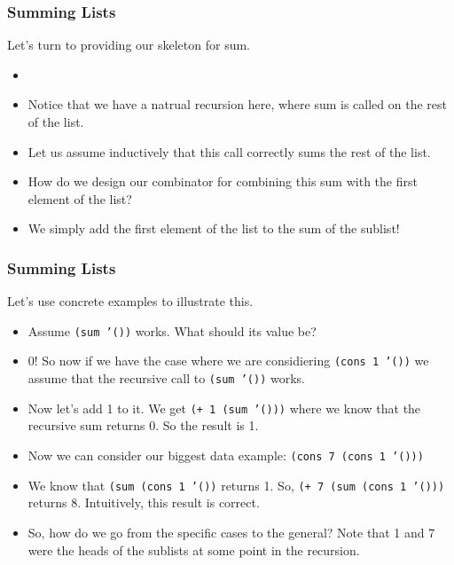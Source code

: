 \documentclass{beamer}
\begin{document}
\begin{frame}
  \frametitle{Summing Lists}
  Let's turn to providing our skeleton for sum.
  \begin{itemize}
  \item<2-> \SumSkeleton
  \item<3-> Notice that we have a natrual recursion here, where
    sum is called on the rest of the list.
  \item<4-> Let us assume inductively that this call correctly sums
    the rest of the list.
  \item<5-> How do we design our combinator for combining this sum
    with the first element of the list?
  \item<6-> We simply add the first element of the list to the sum
    of the sublist!
  \end{itemize}
\end{frame}

\begin{frame}
  \frametitle{Summing Lists}
  Let's use concrete examples to illustrate this.
  \begin{itemize}
  \item<2-> Assume \texttt{(sum '())} works. What should
    its value be?
  \item<3-> 0! So now if we have the case where we are considiering
    \texttt{(cons 1 '())} we assume that the recursive
    call to \texttt{(sum '())} works.
  \item<4-> Now let's add 1 to it. We get
    \texttt{(+ 1 (sum '()))} where we know that
    the recursive sum returns 0. So the result is 1.
  \item<5-> Now we can consider our biggest data example:
    \texttt{(cons 7 (cons 1 '()))}
  \item<6-> We know that \texttt{(sum (cons 1 '())}
    returns 1. So,  \texttt{(+ 7 (sum (cons 1 '()))}
    returns 8. Intuitively, this result is correct.
  \item<7-> So, how do we go from the specific cases to the general? Note that 1 and 7 were the heads of the sublists at some point in the recursion. 
  \end{itemize}
\end{frame}
\end{document}
